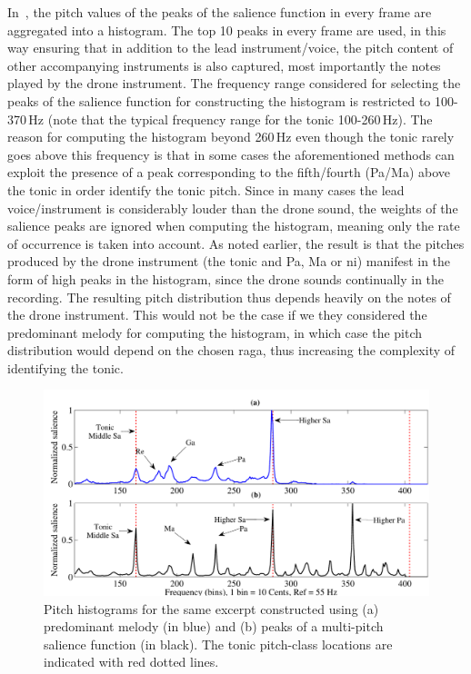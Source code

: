In~\cite{salamon2012multipitch,gulati2012two}, the pitch values of the peaks of the salience function in every frame are aggregated into a histogram. The top 10 peaks in every frame are used, in this way ensuring that in addition to the lead instrument/voice, the pitch content of other accompanying instruments is also captured, most importantly the notes played by the drone instrument. The frequency range considered for selecting the peaks of the salience function for constructing the histogram is restricted to 100-370\,Hz (note that the typical frequency range for the tonic 100-260\,Hz). The reason for computing the histogram beyond 260\,Hz even though the tonic rarely goes above this frequency is that in some cases the aforementioned methods can exploit the presence of a peak corresponding to the fifth/fourth (Pa/Ma) above the tonic in order identify the tonic pitch. Since in many cases the lead voice/instrument is considerably louder than the drone sound, the weights of the salience peaks are ignored when computing the histogram, meaning only the rate of occurrence is taken into account. As noted earlier, the result is that the pitches produced by the drone instrument (the tonic and Pa, Ma or \gls{ni}) manifest in the form of high peaks in the histogram, since the drone sounds continually in the recording. The resulting pitch distribution thus depends heavily on the notes of the drone instrument. This would not be the case if we they considered the predominant melody for computing the histogram, in which case the pitch distribution would depend on the chosen \gls{raga}, thus increasing the complexity of identifying the tonic.

\begin{figure}
	\begin{center}
		\includegraphics[width=\figSizeHundred]{ch02_background/figures/Histogram_Melody_Multipitch.pdf}
	\end{center}
	\caption[Pitch histograms constructed using two different methods]{Pitch histograms for the same excerpt constructed using (a) predominant melody (in blue) and (b) peaks of a multi-pitch salience function (in black). The tonic pitch-class locations are indicated with red dotted lines.}
	\label{fig:background_pitch_histograms_multipitch}
\end{figure}

